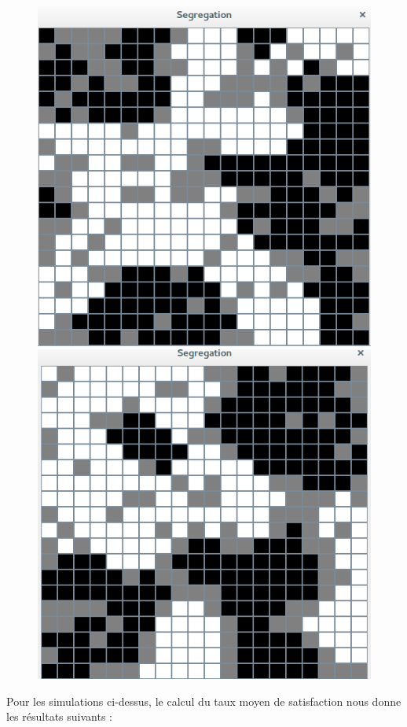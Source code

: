 \documentclass[a4paper,12pt]{report}
\begin{document}
\begin{figure}[!ht]
	\includegraphics[scale=0.3]{150_150_50.png}
	\includegraphics[scale=0.3]{150_150_60.png}
\end{figure}
\newpage
Pour les simulations ci-dessus, le calcul du taux moyen de satisfaction nous donne les résultats suivants :
\end{document}
